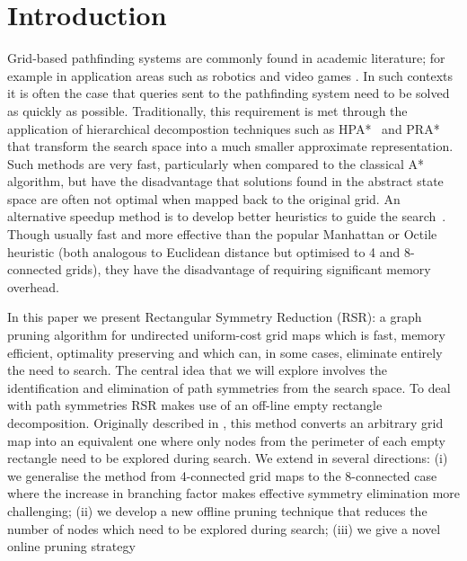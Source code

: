 \section{Introduction}
\label{sec:introduction}

Grid-based pathfinding systems are commonly found in academic literature; for
example in application areas such as robotics \cite{choset05} and video games
\cite{botea04,sturtevant05,bjornsson06}.  In such contexts it is often the case
that queries sent to the pathfinding system need to be solved as quickly as
possible.  Traditionally, this requirement is met through the application of
hierarchical decompostion techniques such as HPA*~\cite{botea04} and PRA*
~\cite{sturtevant05} that transform the search space into a much smaller
approximate representation.  Such methods are very fast, particularly when
compared to the classical A* algorithm, but have the disadvantage that solutions
found in the abstract state space are often not optimal when mapped back to the
original grid.  An alternative speedup method is to develop better
heuristics to guide the search~\cite{sturtevant09}.  Though usually fast and
more effective than the popular Manhattan or Octile heuristic (both analogous to
Euclidean distance but optimised to 4 and 8-connected grids), they have the
disadvantage of requiring significant memory overhead.
\par
In this paper we present Rectangular Symmetry Reduction (RSR): a graph pruning
algorithm for undirected uniform-cost grid maps which is fast, memory efficient,
optimality preserving and which can, in some cases, eliminate entirely the need
to search.  The central idea that we will explore involves the identification
and elimination of path symmetries from the search space. 
To deal with path symmetries RSR makes use of an off-line
empty rectangle decomposition. Originally described in \cite{harabor10}, this
method converts an arbitrary grid map into an equivalent one where only nodes
from the perimeter of each empty rectangle need to be explored during search.
We extend \cite{harabor10} in several directions: (i) we generalise the method
from 4-connected grid maps to the 8-connected case where the increase in
branching factor makes effective symmetry elimination more challenging; (ii) we
develop a new offline pruning technique that reduces the number of nodes which
need to be explored during search; (iii) we give a novel online pruning strategy
